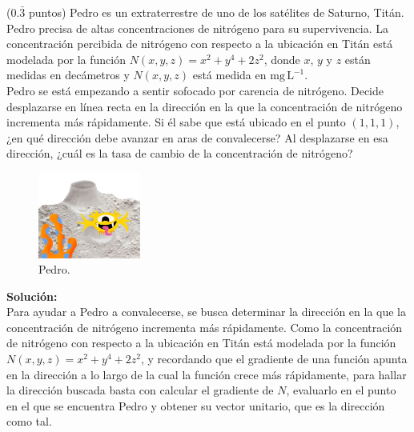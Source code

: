 \documentclass{fmbvecto}
\begin{document}
\begin{problema}[Pedro]
    (\(0.\bar{3}\) puntos) Pedro es un extraterrestre de uno de los satélites de Saturno, Titán. Pedro precisa de altas concentraciones de nitrógeno para su supervivencia. La concentración percibida de nitrógeno con respecto a la ubicación en Titán está modelada por la función \(N(x, y, z) = x^2+y^4+2z^2\), donde \(x\), \(y\) y \(z\) están medidas en decámetros y \(N(x, y, z)\) está medida en \(\mathrm{mg} \, \mathrm{L}^{-1}\). \\
    
    Pedro se está empezando a sentir sofocado por carencia de nitrógeno. Decide desplazarse en línea recta en la dirección en la que la concentración de nitrógeno incrementa más rápidamente. Si él sabe que está ubicado en el punto \((1, 1, 1)\), ¿en qué dirección debe avanzar en aras de convalecerse? Al desplazarse en esa dirección, ¿cuál es la tasa de cambio de la concentración de nitrógeno?
    \begin{figure}[H]
        \centering
        \includegraphics[width=0.3\textwidth]{marciano.png}
        \caption{Pedro.}
    \end{figure}

\vspace{1em}
\tcblower
\textbf{Solución:}\\


Para ayudar a Pedro a convalecerse, se busca determinar la dirección en la que la concentración de nitrógeno incrementa más rápidamente. Como la concentración de nitrógeno con respecto a la ubicación en Titán está modelada por la función \(N(x, y, z) = x^2+y^4+2z^2\), y recordando que el gradiente de una función apunta en la dirección a lo largo de la cual la función crece más rápidamente, para hallar la dirección buscada basta con calcular el gradiente de \(N\), evaluarlo en el punto en el que se encuentra Pedro y obtener su vector unitario, que es la dirección como tal. \\


\end{problema}
\end{document}
